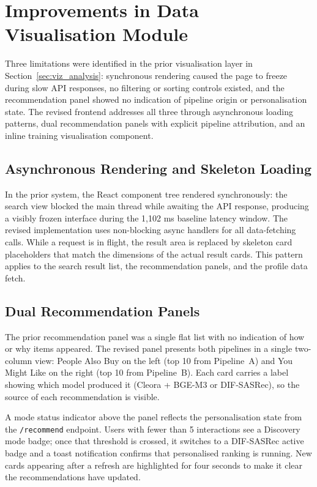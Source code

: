 \section{Improvements in Data Visualisation Module}
\label{sec:viz_improvements}

Three limitations were identified in the prior visualisation layer in Section~\ref{sec:viz_analysis}: synchronous rendering caused the page to freeze during slow API responses, no filtering or sorting controls existed, and the recommendation panel showed no indication of pipeline origin or personalisation state.
The revised frontend addresses all three through asynchronous loading patterns, dual recommendation panels with explicit pipeline attribution, and an inline training visualisation component.

\subsection{Asynchronous Rendering and Skeleton Loading}
\label{sec:skeleton_loading}

In the prior system, the React component tree rendered synchronously: the search view blocked the main thread while awaiting the API response, producing a visibly frozen interface during the 1{,}102 ms baseline latency window.
The revised implementation uses non-blocking async handlers for all data-fetching calls.
While a request is in flight, the result area is replaced by skeleton card placeholders that match the dimensions of the actual result cards.
This pattern applies to the search result list, the recommendation panels, and the profile data fetch.

\subsection{Dual Recommendation Panels}
\label{sec:dual_panels}

The prior recommendation panel was a single flat list with no indication of how or why items appeared.
The revised panel presents both pipelines in a single two-column view: People Also Buy on the left (top 10 from Pipeline~A) and You Might Like on the right (top 10 from Pipeline~B).
Each card carries a label showing which model produced it (Cleora + BGE-M3 or DIF-SASRec), so the source of each recommendation is visible.

A mode status indicator above the panel reflects the personalisation state from the \texttt{/recommend} endpoint.
Users with fewer than 5 interactions see a Discovery mode badge; once that threshold is crossed, it switches to a DIF-SASRec active badge and a toast notification confirms that personalised ranking is running.
New cards appearing after a refresh are highlighted for four seconds to make it clear the recommendations have updated.

